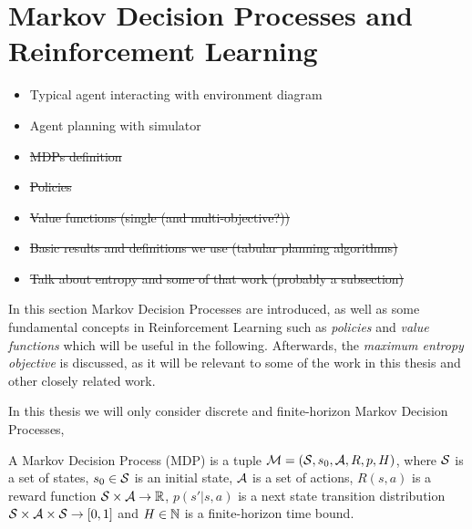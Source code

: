\section{Markov Decision Processes and Reinforcement Learning}
\label{sec:2-1-rl}

    \begin{itemize}
        \item Typical agent interacting with environment diagram 
        \item Agent planning with simulator 
        \item \st{MDPs definition}
        \item \st{Policies}
        \item \st{Value functions (single (and multi-objective?))}
        \item \st{Basic results and definitions we use (tabular planning algorithms)}
        \item \st{Talk about entropy and some of that work (probably a subsection)}
    \end{itemize}


    In this section Markov Decision Processes are introduced, as well as some fundamental concepts in Reinforcement Learning such as \textit{policies} and \textit{value functions} which will be useful in the following. Afterwards, the \textit{maximum entropy objective} is discussed, as it will be relevant to some of the work in this thesis and other closely related work. 

    In this thesis we will only consider discrete and finite-horizon Markov Decision Processes, 

    \begin{defn}
        \label{def:mdp}
        A \textnormal{Markov Decision Process} (MDP) is a tuple $\mathcal{M}=(\mathcal{S},s_0,\mathcal{A},R,p,H)$, where $\mathcal{S}$ is a set of states, $s_0\in\mathcal{S}$ is an initial state, $\mathcal{A}$ is a set of actions, $R(s,a)$ is a reward function $\mathcal{S}\times \mathcal{A}\rightarrow \mathbb{R}$, $p(s' | s,a)$ is a next state transition distribution $\mathcal{S} \times \mathcal{A} \times \mathcal{S} \rightarrow [0,1]$ and $H\in\mathbb{N}$ is a finite-horizon time bound. 
    \end{defn}

